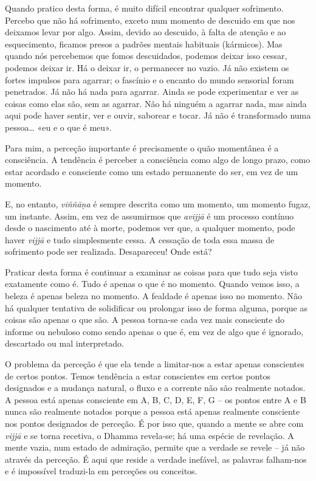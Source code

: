 Quando pratico desta forma, é muito difícil encontrar qualquer sofrimento.
Percebo que não há sofrimento, exceto num momento de descuido em que nos
deixamos levar por algo. Assim, devido ao descuido, à falta de atenção e ao
esquecimento, ficamos presos a padrões mentais habituais (kármicos). Mas quando
nós percebemos que fomos descuidados, podemos deixar isso cessar, podemos deixar
ir. Há o deixar ir, o permanecer no vazio. Já não existem os fortes impulsos
para agarrar; o fascínio e o encanto do mundo sensorial foram penetrados. Já não
há nada para agarrar. Ainda se pode experimentar e ver as coisas como elas são,
sem as agarrar. Não há ninguém a agarrar nada, mas ainda aqui pode haver sentir,
ver e ouvir, saborear e tocar. Já não é transformado numa pessoa\ldots{} «eu e o
que é meu».

Para mim, a perceção importante é precisamente o quão momentânea é a
consciência. A tendência é perceber a consciência como algo de longo prazo, como
estar acordado e consciente como um estado permanente do ser, em vez de um
momento.

E, no entanto, \emph{viññāṇa} é sempre descrita como um momento, um momento
fugaz, um instante. Assim, em vez de assumirmos que \emph{avijjā} é um processo
contínuo desde o nascimento até à morte, podemos ver que, a qualquer momento,
pode haver \emph{vijjā} e tudo simplesmente cessa. A cessação de toda essa massa
de sofrimento pode ser realizada. Desapareceu! Onde está?

Praticar desta forma é continuar a examinar as coisas para que tudo seja visto
exatamente como é. Tudo é apenas o que é no momento. Quando vemos isso, a beleza
é apenas beleza no momento. A fealdade é apenas isso no momento. Não há qualquer
tentativa de solidificar ou prolongar isso de forma alguma, porque as coisas são
apenas o que são. A pessoa torna-se cada vez mais consciente do informe ou
nebuloso como sendo apenas o que é, em vez de algo que é ignorado, descartado ou
mal interpretado.

O problema da perceção é que ela tende a limitar-nos a estar apenas conscientes
de certos pontos. Temos tendência a estar conscientes em certos pontos
designados e a mudança natural, o fluxo e a corrente não são realmente notados.
A pessoa está apenas consciente em A, B, C, D, E, F, G -- os pontos entre A e B
nunca são realmente notados porque a pessoa está apenas realmente consciente nos
pontos designados de perceção. É por isso que, quando a mente se abre com
\emph{vijjā} e se torna recetiva, o Dhamma revela-se; há uma espécie de
revelação. A mente vazia, num estado de admiração, permite que a verdade se
revele -- já não através da perceção. É aqui que reside a verdade inefável, as
palavras falham-nos e é impossível traduzi-la em perceções ou conceitos.

